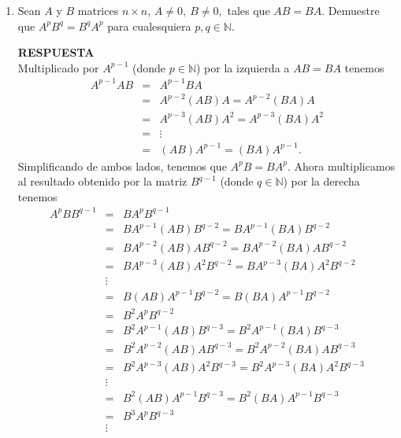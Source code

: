 \documentclass[11pt,letterpaper]{article}
\newcommand{\res}{\textbf{RESPUESTA}\\}
\newcommand{\finf}{\blacksquare.}
\begin{document}
\begin{enumerate}
\res
$\Rightarrow)$ Si $(A-B)(A+B)=A^2-B^2$ entonces:
\begin{equation*}
\begin{array}{ccc}
A^2-B^2&=&(A-B)(A+B)\\
&&\\
&=&AA-BA+AB-BB\\
&&\\
&=&A^2-BA+AB-B^2 \\
&&\\
BA&=&AB.
\end{array}
\end{equation*}
$\Leftarrow)$ Si $AB=AB$ entonces:
$$(A-B)(A+B)=AA-BA+AB-BB=A^2-B^2.$$
Por lo tanto, queda demostrado que $(A-B)(A+B)=A^2-B^2$ si y solo si $AB=BA.\ \ \finf$

\item Sean $A$ y $B$ matrices $n\times n$, $A\neq 0, \ B\neq 0,$ tales que $AB=BA.$ Demuestre que $A^pB^q=B^qA^p$ para cualesquiera $p,q\in \mathbb{N}.$

\res
Multiplicado por $A^{p-1}$ (donde $p\in \mathbb{N}$) por la izquierda a $AB=BA$ tenemos 
\begin{equation*}
\begin{array}{ccc}
A^{p-1}AB&=&A^{p-1}BA\\
&=&A^{p-2}(AB)A=A^{p-2}(BA)A\\
&=&A^{p-3}(AB)A^2=A^{p-3}(BA)A^2\\
&=&\vdots\\
&=&(AB)A^{p-1}=(BA)A^{p-1}.
\end{array}
\end{equation*}
Simplificando de ambos lados, tenemos que $A^pB=BA^p.$ Ahora multiplicamos al resultado obtenido por la matriz $B^{q-1}$ (donde $q\in \mathbb{N}$) por la derecha tenemos 
\begin{equation*}
\begin{array}{ccc}
A^pBB^{q-1}&=&BA^{p}B^{q-1}\\
&=&BA^{p-1}(AB)B^{q-2}=BA^{p-1}(BA)B^{q-2}\\
&=&BA^{p-2}(AB)AB^{q-2}=BA^{p-2}(BA)AB^{q-2}\\
&=&BA^{p-3}(AB)A^2B^{q-2}=BA^{p-3}(BA)A^2B^{q-2}\\
&\vdots&\\
&=&B(AB)A^{p-1}B^{q-2}=B(BA)A^{p-1}B^{q-2}\\
&=&B^2A^{p}B^{q-2}\\
&=&B^2A^{p-1}(AB)B^{q-3}=B^2A^{p-1}(BA)B^{q-3}\\
&=&B^2A^{p-2}(AB)AB^{q-3}=B^2A^{p-2}(BA)AB^{q-3}\\
&=&B^2A^{p-3}(AB)A^2B^{q-3}=B^2A^{p-3}(BA)A^2B^{q-3}\\
&\vdots&\\
&=&B^2(AB)A^{p-1}B^{q-3}=B^2(BA)A^{p-1}B^{q-3}\\
&=&B^3A^{p}B^{q-3}\\
&\vdots&\\
\end{array}
\end{equation*}


\end{enumerate}
\end{document}
